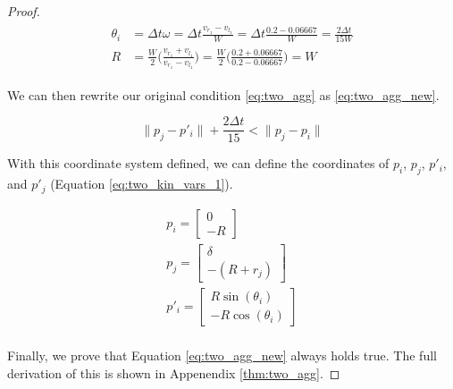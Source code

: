 \documentclass[conference]{IEEEtran}
\begin{document}
\begin{proof}
    \begin{align}
      \begin{split} \label{eq:theta_and_r}
        \theta_i &= \Delta t\omega = \Delta t \frac{v_{r_1} - v_{l_1}}{W} = \Delta t \frac{0.2 - 0.06667}{W} = \frac{2\Delta t}{15W} \\
        R &= \frac{W}{2}\bigg(\frac{v_{r_1} + v_{l_1}}{v_{r_1} - v_{l_1}}\bigg) = \frac{W}{2}\bigg(\frac{0.2 + 0.06667}{0.2 - 0.06667}\bigg) = W
      \end{split}
    \end{align}

    We can then rewrite our original condition \eqref{eq:two_agg} as \eqref{eq:two_agg_new}.

    \begin{equation} \label{eq:two_agg_new}
      \lVert p_j - p'_i \rVert + \frac{2\Delta t}{15} < \lVert p_j - p_i \rVert
    \end{equation}

    With this coordinate system defined, we can define the coordinates of $p_i$, $p_j$, $p'_i$, and $p'_j$ (Equation \eqref{eq:two_kin_vars_1}).

    \begin{equation} \label{eq:two_kin_vars_1}
      \begin{split}
        p_i = \begin{bmatrix}0 \\ -R\end{bmatrix} \\
        p_j = \begin{bmatrix}\delta \\ -(R+r_j)\end{bmatrix} \\
        p'_i = \begin{bmatrix}R\sin(\theta_i) \\ -R\cos(\theta_i)\end{bmatrix} \\
      \end{split}
    \end{equation}

      Finally, we prove that Equation \eqref{eq:two_agg_new} always holds true. The full derivation of this is shown in Appenendix \ref{thm:two_agg}.

    \end{proof}
\end{document}
